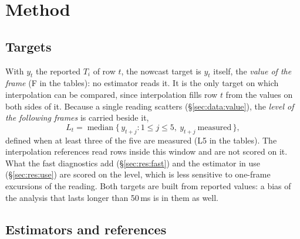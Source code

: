 \documentclass[11pt,a4paper]{article}
\newcommand{\Ti}{\ensuremath{T_i}}
\begin{document}
\section{Method}
\label{sec:methods}

\subsection{Targets}
\label{sec:methods:target}

With $y_t$ the reported \Ti{} of row $t$, the nowcast target is $y_t$ itself, the
\emph{value of the frame} (F in the tables): no estimator reads it. It is the only target
on which interpolation can be compared, since interpolation fills row $t$ from the values
on both sides of it. Because a single reading scatters (\S\ref{sec:data:value}), the
\emph{level of the following frames} is carried beside it,
\begin{equation}
  L_t = \operatorname{median}\bigl\{\,y_{t+j} : 1 \le j \le 5,\ y_{t+j}\ \text{measured}\,\bigr\},
  \label{eq:target}
\end{equation}
defined when at least three of the five are measured (L5 in the tables). The
interpolation references read rows inside this window and are not scored on it. What the
fast diagnostics add (\S\ref{sec:res:fast}) and the estimator in use
(\S\ref{sec:res:use}) are scored on the level, which is less sensitive to one-frame
excursions of the reading. Both targets are built from reported values: a bias of the
analysis that lasts longer than 50\,ms is in them as well.

\subsection{Estimators and references}
\label{sec:methods:est}
\end{document}
